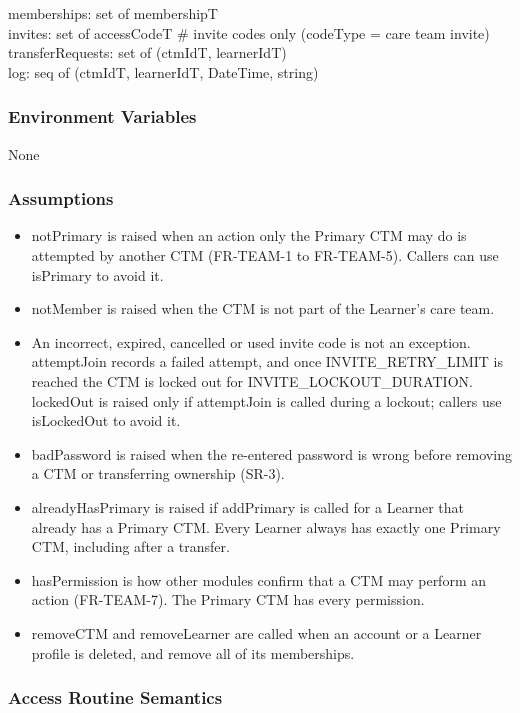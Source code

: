 \documentclass[12pt, titlepage]{article}
\begin{document}
memberships: set of membershipT \\
invites: set of accessCodeT \# invite codes only (codeType = care team invite) \\
transferRequests: set of (ctmIdT, learnerIdT) \\
log: seq of (ctmIdT, learnerIdT, DateTime, string)

\subsubsection{Environment Variables}

None

\subsubsection{Assumptions}

\begin{itemize}
\item notPrimary is raised when an action only the Primary CTM may do is
  attempted by another CTM (FR-TEAM-1 to FR-TEAM-5). Callers can use isPrimary
  to avoid it.
\item notMember is raised when the CTM is not part of the Learner's care team.
\item An incorrect, expired, cancelled or used invite code is not an exception.
  attemptJoin records a failed attempt, and once INVITE\_RETRY\_LIMIT is reached
  the CTM is locked out for INVITE\_LOCKOUT\_DURATION. lockedOut is raised only
  if attemptJoin is called during a lockout; callers use isLockedOut to avoid it.
\item badPassword is raised when the re-entered password is wrong before
  removing a CTM or transferring ownership (SR-3).
\item alreadyHasPrimary is raised if addPrimary is called for a Learner that
  already has a Primary CTM. Every Learner always has exactly one Primary CTM,
  including after a transfer.
\item hasPermission is how other modules confirm that a CTM may perform an
  action (FR-TEAM-7). The Primary CTM has every permission.
\item removeCTM and removeLearner are called when an account or a Learner
  profile is deleted, and remove all of its memberships.
\end{itemize}

\subsubsection{Access Routine Semantics}
\end{document}
